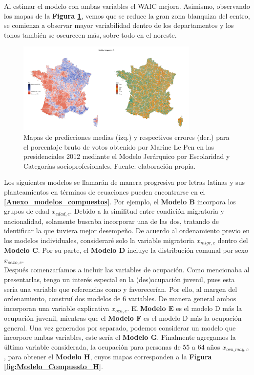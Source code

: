 Al estimar el modelo con ambas variables el WAIC mejora. Asimismo, observando los mapas de la \textbf{Figura \ref{fig:Modelo_Compuesto_A}}, vemos que se reduce la gran zona blanquiza del centro, se comienza a observar mayor variabilidad dentro de los departamentos y los tonos también se oscurecen más, sobre todo en el noreste.\\ 

\begin{figure}[h]
	\centering
	\includegraphics[width = 0.8\textwidth]{Figs/Modelado/Modelo_Compuesto_A}
	\caption{Mapas de predicciones medias (izq.) y respectivos errores (der.) para el porcentaje bruto de votos obtenido por Marine Le Pen en las presidenciales 2012 mediante el Modelo Jerárquico por Escolaridad y Categorías socioprofesionales. Fuente: elaboración propia.}
	\label{fig:Modelo_Compuesto_A}
\end{figure}

Los siguientes modelos se llamarán de manera progresiva por letras latinas y sus planteamientos en términos de ecuaciones pueden encontrarse en el \textbf{\autoref{Anexo_modelos_compuestos}}. Por ejemplo, el \textbf{Modelo B} incorpora los grupos de edad $x_{edad,c}$. Debido a la similitud entre condición migratoria y nacionalidad, solamente buscaba incorporar una de las dos, tratando de identificar la que tuviera mejor desempeño. De acuerdo al ordenamiento previo en los modelos individuales, consideraré solo la variable migratoria $x_{migr,c}$ dentro del \textbf{Modelo C}. Por su parte, el \textbf{Modelo D} incluye la distribución comunal por sexo $x_{sexo,c}$.\\

Después comenzaríamos a incluir las variables de ocupación. Como mencionaba al presentarlas, tengo un interés especial en la (des)ocupación juvenil, pues esta sería una variable que referencias como \textcite{LeBras16} y \textcite{Perrineau07} favorecerían. Por ello, al margen del ordenamiento, construí dos modelos de 6 variables. De manera general ambos incorporan una variable explicativa $x_{ocu,c}$. El \textbf{Modelo E} es el modelo D más la ocupación juvenil, mientras que el \textbf{Modelo F} es el modelo D más la ocupación general. Una vez generados por separado, podemos considerar un modelo que incorpore ambas variables, este sería el \textbf{Modelo G}. Finalmente agregamos la última variable considerada, la ocupación para personas de 55 a 64 años $x_{ocu\_may,c}$, para obtener el \textbf{Modelo H}, cuyos mapas corresponden a la \textbf{Figura \ref{fig:Modelo_Compuesto_H}}.\\

